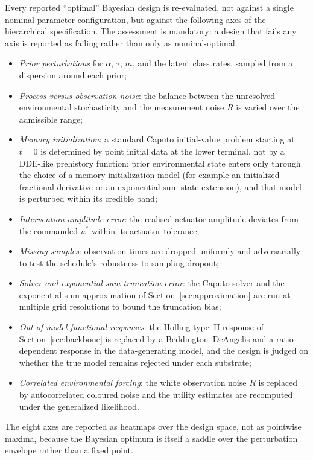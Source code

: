 Every reported ``optimal'' Bayesian design is re-evaluated, not against a single nominal parameter configuration, but against the following axes of the hierarchical specification. The assessment is mandatory: a design that fails any axis is reported as failing rather than only as nominal-optimal.
\begin{itemize}
\item \emph{Prior perturbations} for $\alpha$, $\tau$, $m$, and the latent class rates, sampled from a dispersion around each prior;
\item \emph{Process versus observation noise}: the balance between the unresolved environmental stochasticity and the measurement noise $R$ is varied over the admissible range;
\item \emph{Memory initialization}: a standard Caputo initial-value problem starting at $t=0$ is determined by point initial data at the lower terminal, not by a DDE-like prehistory function; prior environmental state enters only through the choice of a memory-initialization model (for example an initialized fractional derivative or an exponential-sum state extension), and that model is perturbed within its credible band;
\item \emph{Intervention-amplitude error}: the realised actuator amplitude deviates from the commanded $u^{*}$ within its actuator tolerance;
\item \emph{Missing samples}: observation times are dropped uniformly and adversarially to test the schedule's robustness to sampling dropout;
\item \emph{Solver and exponential-sum truncation error}: the Caputo solver and the exponential-sum approximation of Section~\ref{sec:approximation} are run at multiple grid resolutions to bound the truncation bias;
\item \emph{Out-of-model functional responses}: the Holling type~II response of Section~\ref{sec:backbone} is replaced by a Beddington--DeAngelis and a ratio-dependent response in the data-generating model, and the design is judged on whether the true model remains rejected under each substrate;
\item \emph{Correlated environmental forcing}: the white observation noise $R$ is replaced by autocorrelated coloured noise and the utility estimates are recomputed under the generalized likelihood.
\end{itemize}
The eight axes are reported as heatmaps over the design space, not as pointwise maxima, because the Bayesian optimum is itself a saddle over the perturbation envelope rather than a fixed point.

